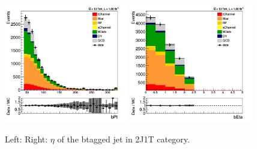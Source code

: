 \begin{figure}[!Hhtb]
  \begin{center}
    \includegraphics[width=0.48\textwidth]{figures/2J1T/bPt.png}
    \includegraphics[width=0.48\textwidth]{figures/2J1T/b_eta.png}
    \caption{\label{fig:2J1TMETMT}{Left: \PT  Right: $\eta$ of the btagged jet in 2J1T category.}}
  \end{center}
\end{figure}

